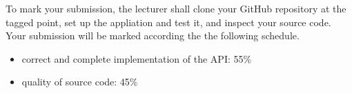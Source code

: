 \documentclass{article}
\begin{document}
To mark your submission, the lecturer shall clone your GitHub repository at the tagged point, set up the appliation and test it, and inspect your source code.  Your submission will be marked according the the following schedule.

\begin{itemize}
  \item correct and complete implementation of the API:  55\%
  \item quality of source code: 45\%
\end{itemize}
\end{document}
